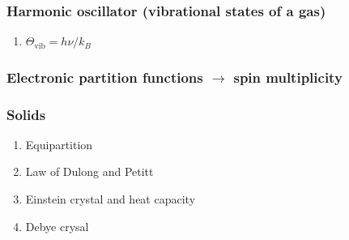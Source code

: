 \documentclass[11pt]{article}
\begin{document}
\subsubsection{Harmonic oscillator (vibrational states of a gas)}
\label{sec:org73ddfa2}
\begin{enumerate}
\item \(\Theta_\mathrm{vib}=h\nu/k_B\)
\end{enumerate}
\subsubsection{Electronic partition functions \(\rightarrow\) spin multiplicity}
\label{sec:orga2b5a1e}
\subsubsection{Solids}
\label{sec:orgcd83ca4}
\begin{enumerate}
\item Equipartition
\item Law of Dulong and Petitt
\item Einstein crystal and heat capacity
\item Debye crysal
\end{enumerate}
\end{document}
